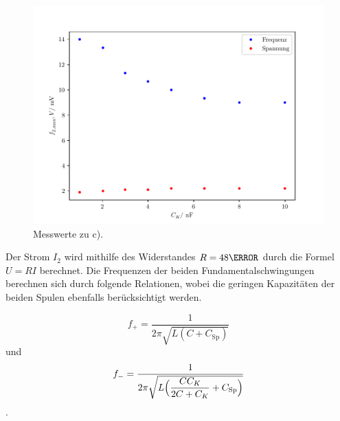 \begin{figure}[H]
  \centering
  \includegraphics{freq2.pdf}
  \caption{Messwerte zu c).}
  \label{fig:freq2}
\end{figure}


Der Strom $I_2$ wird mithilfe des Widerstandes $R=\si{48}{\ohm}$ durch die Formel $U=RI$ berechnet.
Die Frequenzen der beiden Fundamentalschwingungen berechnen sich durch folgende Relationen, wobei %
die geringen Kapazitäten der beiden Spulen ebenfalls berücksichtigt werden.

\begin{equation}
  f_+ = \frac{1}{2\pi\sqrt{L(C + C_\text{Sp})}}
\end{equation} 
und \newline 
\begin{equation}
  f_- = \frac{1}{2\pi\sqrt{L\Bigl(\dfrac{CC_K}{2C+C_K} + C_\text{Sp}\Bigr)}}
\end{equation}.  


